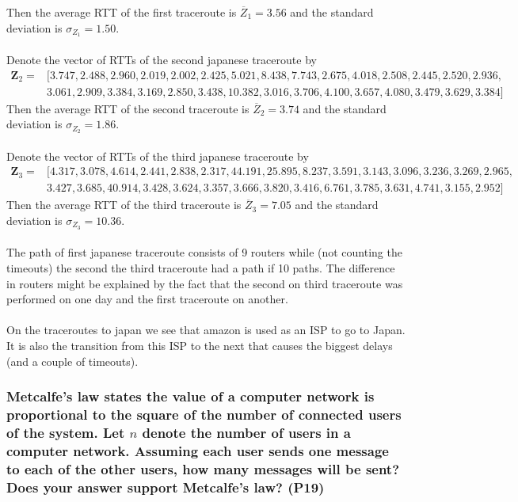 Then the average RTT of the first traceroute is $\overline{Z}_1 = 3.56$ and the standard deviation is $\sigma_{Z_1} = 1.50$. \\
\\
Denote the vector of RTTs of the second japanese traceroute by
\begin{equation*}
\begin{split}
    \mathbf{Z}_2 = &[
        3.747, 2.488, 2.960,
        2.019, 2.002, 2.425,
        5.021, 8.438, 7.743,
        2.675, 4.018, 2.508,
        2.445, 2.520, 2.936, \\
        &3.061, 2.909, 3.384,
        3.169, 2.850, 3.438,
        10.382, 3.016, 3.706,
        4.100, 3.657, 4.080,
        3.479, 3.629, 3.384
    ]
\end{split}
\end{equation*}
Then the average RTT of the second traceroute is $\overline{Z}_2 = 3.74$ and the standard deviation is $\sigma_{Z_2} = 1.86$. \\
\\
Denote the vector of RTTs of the third japanese traceroute by
\begin{equation*}
\begin{split}
    \mathbf{Z}_3 = &[
        4.317, 3.078, 4.614,
        2.441, 2.838, 2.317,
        44.191, 25.895, 8.237,
        3.591, 3.143, 3.096,
        3.236, 3.269, 2.965, \\
        &3.427, 3.685, 40.914,
        3.428, 3.624, 3.357,
        3.666, 3.820, 3.416,
        6.761, 3.785, 3.631,
        4.741, 3.155, 2.952
    ]
\end{split}
\end{equation*}
Then the average RTT of the third traceroute is $\overline{Z}_3 = 7.05$ and the standard deviation is $\sigma_{Z_3} = 10.36$. \\
\\
The path of first japanese traceroute consists of 9 routers while (not counting the timeouts) the second the third traceroute had a path if 10 paths. The difference in routers might be explained by the fact that the second on third traceroute was performed on one day and the first traceroute on another. \\
\\
On the traceroutes to japan we see that amazon is used as an ISP to go to Japan. It is also the transition from this ISP to the next that causes the biggest delays (and a couple of timeouts).

\subsubsection{Metcalfe's law states the value of a computer network is proportional to the square of the number of connected users of the system. Let $n$ denote the number of users in a computer network. Assuming each user sends one message to each of the other users, how many messages will be sent? Does your answer support Metcalfe's law? (P19)}

